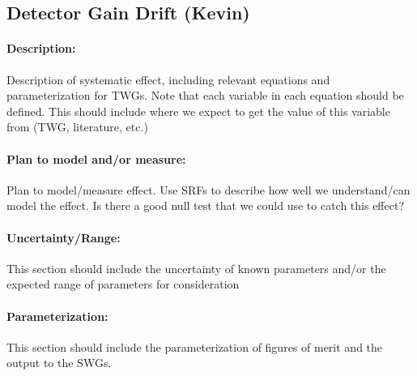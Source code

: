 \subsection{Detector Gain Drift (Kevin)}

\paragraph{Description:}
Description of systematic effect, including relevant equations and
parameterization for TWGs. Note that each variable in each equation should be
defined. This should include where we expect to get the value of this variable
from (TWG, literature, etc.)

\paragraph{Plan to model and/or measure:}
Plan to model/measure effect. Use SRFs to describe how well we understand/can model the effect. Is there a good null test that we could use to catch this effect?

\paragraph{Uncertainty/Range:}
This section should include the uncertainty of
known parameters and/or the expected range of parameters for consideration

\paragraph{Parameterization:}
This section should include the parameterization of figures of
merit and the output to the SWGs.
